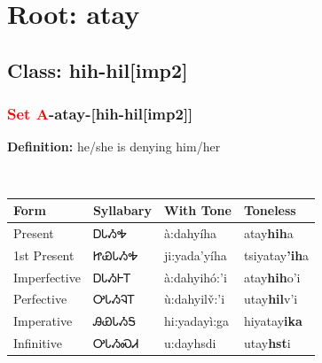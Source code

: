 \needspace{4in}
\section*{Root: atay}
\nopagebreak
{}
\needspace{3in}
\subsection*{Class: hih-hil[imp2]}
\nopagebreak
\needspace{2in}
\subsubsection*{\textcolor{Red}{Set A}{-}\textbf{atay}{-}[hih-hil[imp2]]}
\nopagebreak
\textbf{Definition: } he/she is denying him/her
\\[0.5em]
\begin{tabularx}{\textwidth}{l X X X}%
\toprule%
\textbf{Form}&\textbf{Syllabary}&\textbf{With Tone}&\textbf{Toneless}\\%
\midrule%
Present&ᎠᏓᏱᎭ&à:dahyíha&atay\textbf{hih}a\\%
1st Present&ᏥᏯᏓᏱᎭ&ji:yada’yíha&tsiyatay\textbf{'ih}a\\%
Imperfective&ᎠᏓᏱᎰᎢ&à:dahyihó:’i&atay\textbf{hih}o'i\\%
Perfective&ᎤᏓᏱᎸᎢ&ù:dahyilv̌:’i&utay\textbf{hil}v'i\\%
Imperative&ᎯᏯᏓᏱᎦ&hi:yadayì:ga&hiyatay\textbf{ika}\\%
Infinitive&ᎤᏓᏱᏍᏗ&u:dayhsdi&utay\textbf{hst}i\\%
\bottomrule%
\end{tabularx}
\\[1em]